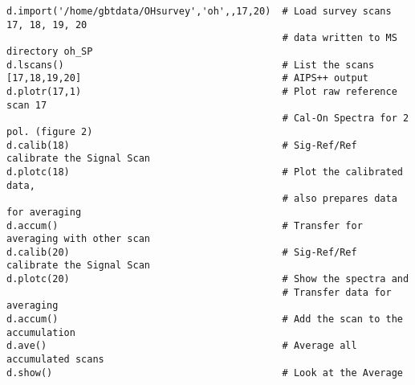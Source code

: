 
\begin{verbatim}
d.import('/home/gbtdata/OHsurvey','oh',,17,20)  # Load survey scans 17, 18, 19, 20
                                                # data written to MS directory oh_SP 
d.lscans()                                      # List the scans
[17,18,19,20]                                   # AIPS++ output
d.plotr(17,1)                                   # Plot raw reference scan 17
                                                # Cal-On Spectra for 2 pol. (figure 2)
d.calib(18)                                     # Sig-Ref/Ref calibrate the Signal Scan
d.plotc(18)                                     # Plot the calibrated data,
                                                # also prepares data for averaging
d.accum()                                       # Transfer for averaging with other scan
d.calib(20)                                     # Sig-Ref/Ref calibrate the Signal Scan
d.plotc(20)                                     # Show the spectra and 
                                                # Transfer data for averaging
d.accum()                                       # Add the scan to the accumulation
d.ave()                                         # Average all accumulated scans
d.show()                                        # Look at the Average
\end{verbatim}

